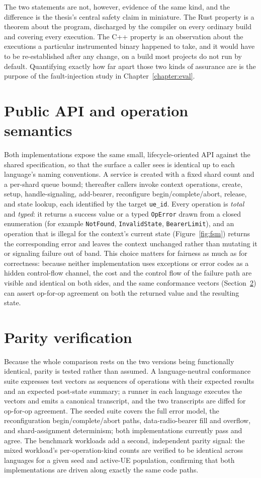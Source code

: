 \documentclass[english,twoside,openright,a4paper,censored,csm,software-track-2020]{HYthesisML}
\begin{document}
The two statements are not, however, evidence of the same kind, and the difference is the
thesis's central safety claim in miniature. The Rust property is a theorem about the program,
discharged by the compiler on every ordinary build and covering every execution. The C++
property is an observation about the executions a particular instrumented binary happened to
take, and it would have to be re-established after any change, on a build most projects do not
run by default. Quantifying exactly how far apart those two kinds of assurance are is the
purpose of the fault-injection study in Chapter~\ref{chapter:eval}.

\section{Public API and operation semantics}
Both implementations expose the same small, lifecycle-oriented API against the shared
specification, so that the surface a caller sees is identical up to each language's naming
conventions. A service is created with a fixed shard count and a per-shard queue bound;
thereafter callers invoke context operations, create, setup, handle-signaling, add-bearer,
reconfigure begin/complete/abort, release, and state lookup, each identified by the target
\texttt{ue\_id}. Every operation is \emph{total} and \emph{typed}: it returns a success value or
a typed \texttt{OpError} drawn from a closed enumeration (for example \texttt{NotFound},
\texttt{InvalidState}, \texttt{BearerLimit}), and an operation that is illegal for the context's
current state (Figure~\ref{fig:fsm}) returns the corresponding error and leaves the context
unchanged rather than mutating it or signaling failure out of band. This choice matters for
fairness as much as for correctness: because neither implementation uses exceptions or error
codes as a hidden control-flow channel, the cost and the control flow of the failure path are
visible and identical on both sides, and the same conformance vectors (Section~\ref{sec:parity})
can assert op-for-op agreement on both the returned value and the resulting state.

\section{Parity verification}
\label{sec:parity}
Because the whole comparison rests on the two versions being functionally identical, parity
is tested rather than assumed. A language-neutral conformance suite expresses test vectors as
sequences of operations with their expected results and an expected post-state summary; a
runner in each language executes the vectors and emits a canonical transcript, and the two
transcripts are diffed for op-for-op agreement. The seeded suite covers the full error model,
the reconfiguration begin/complete/abort paths, data-radio-bearer fill and overflow, and
shard-assignment determinism; both implementations currently pass and agree. The benchmark
workloads add a second, independent parity signal: the mixed workload's per-operation-kind
counts are verified to be identical across languages for a given seed and active-UE
population, confirming that both implementations are driven along exactly the same code paths.
\end{document}
